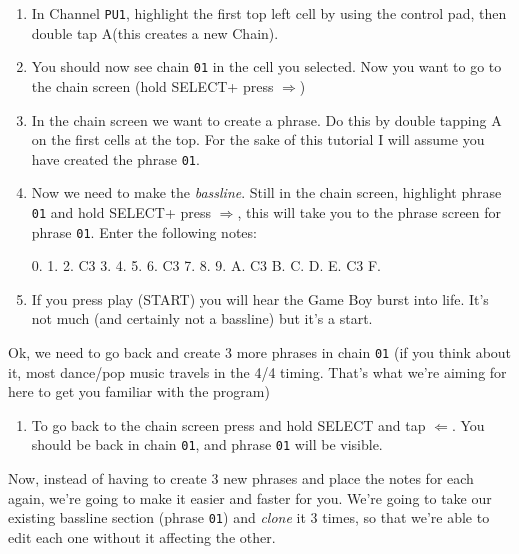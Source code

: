 \documentclass[]{article}
\newcommand{\buttonStyle}[1]{\textsf{#1}\xspace}
\newcommand{\buttonSymbolStyle}[1]{$\bm{#1}$\xspace}
\newcommand{\bA}{\buttonStyle{A}}
\newcommand{\bStart}{\buttonStyle{{START}}}
\newcommand{\bSelect}{\buttonStyle{{SELECT}}}
\newcommand{\bRight}{\buttonSymbolStyle{\Rightarrow}}
\newcommand{\bLeft}{\buttonSymbolStyle{\Leftarrow}}
\newcommand{\nb}[1]{\texttt{#1}\xspace}
\begin{document}
\begin{enumerate}

\item In Channel \nb{PU1}, highlight the first top left cell by using the control pad, then double tap \bA (this creates a new Chain).

\item You should now see chain \nb{01} in the cell you selected. Now you want to go to the chain screen (hold \bSelect + press \bRight)

\item In the chain screen we want to create a phrase. Do this by double tapping \bA on the first cells at the top. For the sake of this tutorial I will assume you have created the phrase \nb{01}.

\item Now we need to make the \textit{bassline}. Still in the chain screen, highlight phrase \nb{01} and hold \bSelect + press \bRight, this will take you to the phrase screen for phrase \nb{01}. Enter the following notes:
\begin{notes}
0.
1.
2. C3
3.
4.
5.
6. C3
7.
8.
9.
A. C3
B.
C.
D.
E. C3
F.
\end{notes}

\item If you press play (\bStart) you will hear the Game Boy burst into life. It's not much (and certainly not a bassline) but it's a start.

\end{enumerate}

Ok, we need to go back and create 3 more phrases in chain \nb{01} (if you think about it, most dance/pop music travels in the 4/4 timing. That's what we're aiming for here to get you familiar with the program) %

\begin{enumerate}[resume]


\item To go back to the chain screen press and hold \bSelect and tap \bLeft. You should be back in chain \nb{01}, and phrase \nb{01} will be visible.

\end{enumerate}

Now, instead of having to create 3 new phrases and place the notes for each again, we're going to make it easier and faster for you. We're going to take our existing bassline section (phrase \nb{01}) and \textit{clone} it 3 times, so that we're able to edit each one without it affecting the other. 
\end{document}
